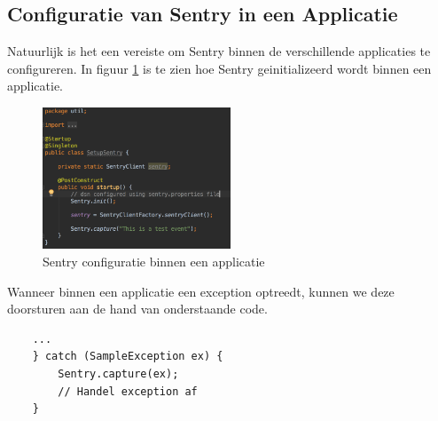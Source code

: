 \subsection{Configuratie van Sentry in een Applicatie}
Natuurlijk is het een vereiste om Sentry binnen de verschillende applicaties te configureren. In figuur \ref{fig:SentryApplicatieConfiguratie} is te zien hoe Sentry geinitializeerd wordt binnen een applicatie.
\begin{figure}[H]
	\centering
	\includegraphics[width=0.50\textwidth]{img/SentryApplicatieConfiguratie.png}
	\caption{Sentry configuratie binnen een applicatie}
	\label{fig:SentryApplicatieConfiguratie}
\end{figure}
Wanneer binnen een applicatie een exception optreedt, kunnen we deze doorsturen aan de hand van onderstaande code.
\begin{lstlisting}
	... 
	} catch (SampleException ex) {
		Sentry.capture(ex);
		// Handel exception af
	}
\end{lstlisting}